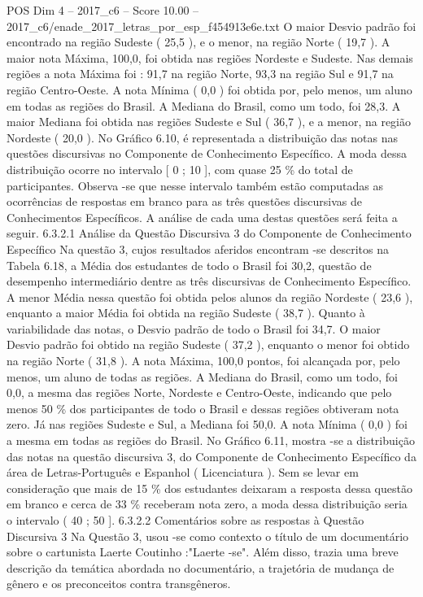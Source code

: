 \begin{textsample}{POS Dim 4 – 2017\_c6 – Score 10.00 – 2017\_c6/enade\_2017\_letras\_por\_esp\_f454913e6e.txt}
O maior Desvio padrão foi encontrado na região Sudeste ( 25,5 ), e o menor, na região Norte ( 19,7 ).
A maior nota Máxima, 100,0, foi obtida nas regiões Nordeste e Sudeste.
Nas demais regiões a nota Máxima foi : 91,7 na região Norte, 93,3 na região Sul e 91,7 na região Centro-Oeste.
A nota Mínima ( 0,0 ) foi obtida por, pelo menos, um aluno em todas as regiões do Brasil.
A Mediana do Brasil, como um todo, foi 28,3.
A maior Mediana foi obtida nas regiões Sudeste e Sul ( 36,7 ), e a menor, na região Nordeste ( 20,0 ).
No Gráfico 6.10, é representada a distribuição das notas nas questões discursivas no Componente de Conhecimento Específico.
A moda dessa distribuição ocorre no intervalo [ 0 ; 10 ], com quase 25 \% do total de participantes.
Observa -se que nesse intervalo também estão computadas as ocorrências de respostas em branco para as três questões discursivas de Conhecimentos Específicos.
A análise de cada uma destas questões será feita a seguir. 6.3.2.1 Análise da Questão Discursiva 3 do Componente de Conhecimento Específico Na questão 3, cujos resultados aferidos encontram -se descritos na Tabela 6.18, a Média dos estudantes de todo o Brasil foi 30,2, questão de desempenho intermediário dentre as três discursivas de Conhecimento Específico.
A menor Média nessa questão foi obtida pelos alunos da região Nordeste ( 23,6 ), enquanto a maior Média foi obtida na região Sudeste ( 38,7 ).
Quanto à variabilidade das notas, o Desvio padrão de todo o Brasil foi 34,7.
O maior Desvio padrão foi obtido na região Sudeste ( 37,2 ), enquanto o menor foi obtido na região Norte ( 31,8 ).
A nota Máxima, 100,0 pontos, foi alcançada por, pelo menos, um aluno de todas as regiões.
A Mediana do Brasil, como um todo, foi 0,0, a mesma das regiões Norte, Nordeste e Centro-Oeste, indicando que pelo menos 50 \% dos participantes de todo o Brasil e dessas regiões obtiveram nota zero.
Já nas regiões Sudeste e Sul, a Mediana foi 50,0.
A nota Mínima ( 0,0 ) foi a mesma em todas as regiões do Brasil.
No Gráfico 6.11, mostra -se a distribuição das notas na questão discursiva 3, do Componente de Conhecimento Específico da área de Letras-Português e Espanhol ( Licenciatura ).
Sem se levar em consideração que mais de 15 \% dos estudantes deixaram a resposta dessa questão em branco e cerca de 33 \% receberam nota zero, a moda dessa distribuição seria o intervalo ( 40 ; 50 ]. 6.3.2.2 Comentários sobre as respostas à Questão Discursiva 3 Na Questão 3, usou -se como contexto o título de um documentário sobre o cartunista Laerte Coutinho :"Laerte -se".
Além disso, trazia uma breve descrição da temática abordada no documentário, a trajetória de mudança de gênero e os preconceitos contra transgêneros.

\end{textsample}
